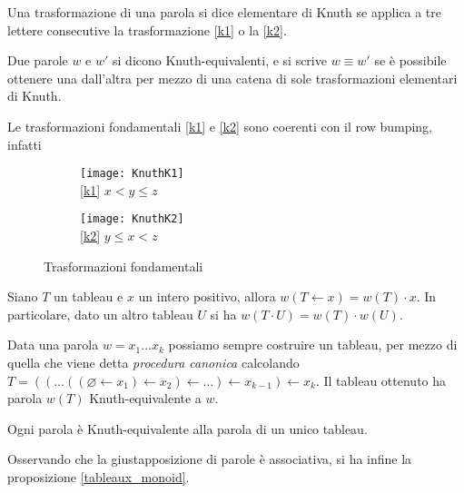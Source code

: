 \begin{defn}
Una trasformazione di una parola si dice elementare di Knuth se
applica a tre lettere consecutive la trasformazione \eqref{k1} o la
\eqref{k2}.
\end{defn}

\begin{defn}
Due parole $w$ e $w'$ si dicono Knuth-equivalenti, e si scrive $w
\equiv w'$ se \`e possibile ottenere una dall'altra per mezzo di una catena di
sole trasformazioni elementari di Knuth.
\end{defn}
\begin{oss}
Le trasformazioni fondamentali \eqref{k1} e \eqref{k2} sono coerenti
con il row bumping, infatti

\begin{figure}[h]
\centering

\begin{subfigure}[b]{0.3\textwidth}
\centering
\texttt{[image: KnuthK1]}\\
\eqref{k1} $x < y \leq z$
\end{subfigure}%
\begin{subfigure}[b]{0.3\textwidth}
\centering
\texttt{[image: KnuthK2]}\\
\eqref{k2} $y \leq x < z$
\end{subfigure}

\caption{Trasformazioni fondamentali}
\end{figure}
\end{oss}

\begin{prop}\label{word_bump_equiv}
Siano $T$ un tableau e $x$ un intero positivo, allora $w(T \gets x) = w(T)
\cdot x$. In particolare, dato un altro tableau $U$ si ha $w(T\cdot U)
= w(T) \cdot w(U)$.
\end{prop}

Data una parola $w = x_1 \ldots x_k$ possiamo sempre costruire un
tableau, per mezzo di quella che viene detta \emph{procedura canonica}
calcolando $T = (( \ldots ((\varnothing \gets x_1) \gets x_2 ) \gets \ldots ) \gets x_{k-1} )
\gets x_k$. Il tableau ottenuto ha parola $w(T)$ Knuth-equivalente a
$w$.

\begin{teo}\label{knuth_equiv_word}
Ogni parola \`e Knuth-equivalente alla parola di un unico tableau.
\end{teo}

Osservando che la giustapposizione di parole \`e associativa, si ha
infine la proposizione \ref{tableaux_monoid}.
